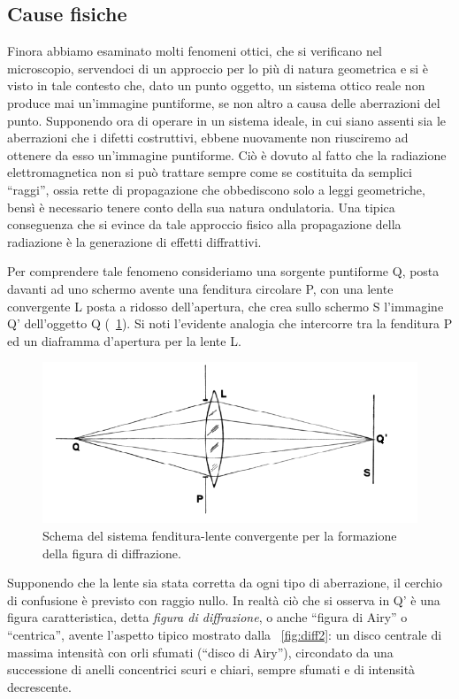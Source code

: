 \subsection {Cause fisiche}

Finora abbiamo esaminato molti fenomeni ottici, che si verificano nel microscopio, servendoci di un approccio per lo più di natura geometrica e si è visto in tale contesto che, dato un punto oggetto, un sistema ottico reale non produce mai un'immagine puntiforme, se non altro a causa delle aberrazioni del punto.
Supponendo ora di operare in un sistema ideale, in cui siano assenti sia le aberrazioni che i difetti costruttivi, ebbene nuovamente non riusciremo ad ottenere da esso un'immagine puntiforme. 
Ciò è dovuto al fatto che la radiazione elettromagnetica non si può trattare sempre come se costituita da semplici ``raggi'', ossia rette di propagazione che obbediscono solo a leggi geometriche, bensì è necessario tenere conto della sua natura ondulatoria.
Una tipica conseguenza che si evince da tale approccio fisico alla propagazione della radiazione è la generazione di effetti diffrattivi.

Per comprendere tale fenomeno consideriamo una sorgente puntiforme Q, posta davanti ad uno schermo avente una fenditura circolare P, con una lente convergente L posta a ridosso dell'apertura, che crea sullo schermo S l'immagine Q' dell'oggetto Q (\figurename~\ref{fig:diff}).
Si noti l'evidente analogia che intercorre tra la fenditura P ed un diaframma d'apertura per la lente L.

\begin{figure}
 \centering
 \includegraphics[scale=.50]{img/CAP2diff.png}
 \caption{\small{Schema del sistema fenditura-lente convergente per la formazione della figura di diffrazione.}}
 \label{fig:diff}
\end{figure}

Supponendo che la lente sia stata corretta da ogni tipo di aberrazione, il cerchio di confusione è previsto con raggio nullo. 
In realtà ciò che si osserva in Q' è una figura caratteristica, detta \textit{figura di diffrazione}, o anche ``figura di Airy'' o ``centrica'', avente l'aspetto tipico mostrato dalla \figurename~\ref{fig:diff2}: un disco centrale di massima intensità con orli sfumati (``disco di Airy''), circondato da una successione di anelli concentrici scuri e chiari, sempre sfumati e di intensità decrescente.

